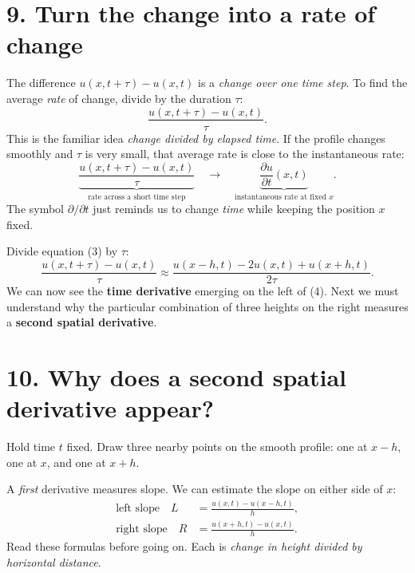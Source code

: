 \documentclass[11pt,a4paper]{article}
\begin{document}
\section{9. Turn the change into a rate of change}
The difference $u(x,t+\tau)-u(x,t)$ is a \emph{change over one time step}. To find the average \emph{rate} of change, divide by the duration $\tau$:
\[
\frac{u(x,t+\tau)-u(x,t)}{\tau}.
\]
This is the familiar idea \emph{change divided by elapsed time}. If the profile changes smoothly and $\tau$ is very small, that average rate is close to the instantaneous rate:
\[
\underbrace{\frac{u(x,t+\tau)-u(x,t)}{\tau}}_{\text{rate across a short time step}}
\quad\longrightarrow\quad
\underbrace{\frac{\partial u}{\partial t}(x,t)}_{\text{instantaneous rate at fixed $x$}}.
\]
The symbol $\partial/\partial t$ just reminds us to change \emph{time} while keeping the position $x$ fixed.

Divide equation (3) by $\tau$:
\[
\boxed{\displaystyle
\frac{u(x,t+\tau)-u(x,t)}{\tau}
\approx
\frac{u(x-h,t)-2u(x,t)+u(x+h,t)}{2\tau}.}
\tag{4}
\]
We can now see the \textbf{time derivative} emerging on the left of (4). Next we must understand why the particular combination of three heights on the right measures a \textbf{second spatial derivative}.

\newpage
\section{10. Why does a second spatial derivative appear?}
Hold time $t$ fixed. Draw three nearby points on the smooth profile: one at $x-h$, one at $x$, and one at $x+h$.

A \emph{first} derivative measures slope. We can estimate the slope on either side of $x$:
\[
\begin{aligned}
\text{left slope}\quad L&=\frac{u(x,t)-u(x-h,t)}{h},\\[5pt]
\text{right slope}\quad R&=\frac{u(x+h,t)-u(x,t)}{h}.
\end{aligned}
\]
Read these formulas before going on. Each is \emph{change in height divided by horizontal distance}.

\begin{center}
\end{center}
\end{document}

